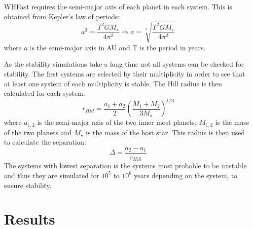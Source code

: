 \documentclass[12pt]{report}
\begin{document}
	WHFast requires the semi-major axis of each planet in each system. This is obtained from Kepler's law of periods:
	\begin{equation}
		a^3 = \frac{T^2 G M_{\star}}{4\pi^2} \Rightarrow a = \sqrt[3]{\frac{T^2 G M_{\star}}{4\pi^2}}
	\end{equation}
		where $a$ is the semi-major axis in AU and T is the period in years. 
		
	As the stability simulations take a long time not all systems can be checked for stability. The first systems are selected by their multiplicity in order to see that at least one system of each multiplicity is stable. The Hill radius is then calculated for each system:
	\begin{equation}
		r_{Hill} = \frac{a_1 + a_2}{2}\left(\frac{M_1 + M_2}{3M_{\star}}\right)^{1/3}
	\end{equation}
	where $a_{1,2}$ is the semi-major axis of the two inner most planets, $M_{1,2}$ is the mass of the two planets and $M_{\star}$ is the mass of the host star. This radius is then used to calculate the separation:
	\begin{equation}
		\Delta = \frac{a_2 - a_1}{r_{Hill}}
	\end{equation}
	The systems with lowest separation is the systems most probable to be unstable \citep{1996Icar..119..261C} and thus they are simulated for $10^5$ to $10^6$ years depending on the system, to ensure stability. 
	

	

\chapter{Results}

\end{document}
